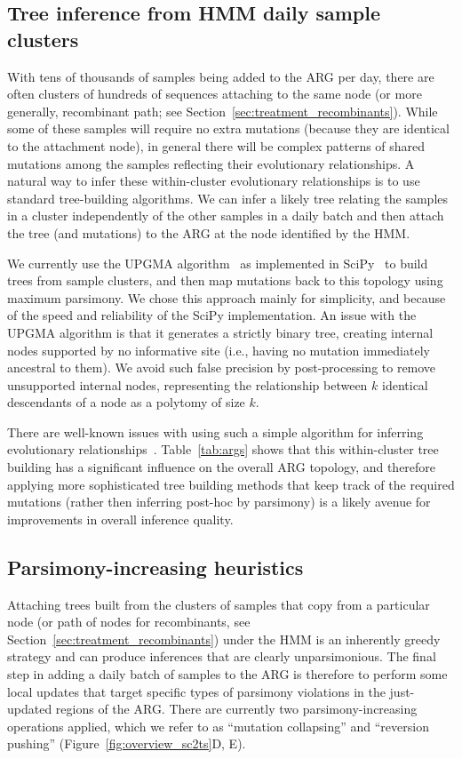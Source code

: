\documentclass{article}
\begin{document}
\subsection{Tree inference from HMM daily sample clusters}
\label{sec:sample-cluster-tree-inference}
With tens of thousands of samples being added to the ARG per day,
there are often clusters of hundreds of sequences attaching to the same node
(or more generally, recombinant path;
see Section~\ref{sec:treatment_recombinants}).
While some of these samples will require no extra mutations
(because they are identical to the attachment node), in general there
will be complex patterns of shared mutations among the samples
reflecting their evolutionary relationships. A natural way to infer
these within-cluster evolutionary relationships is to use standard
tree-building algorithms.
We can infer a likely tree relating the
samples in a cluster independently of the other samples in a
daily batch and then attach the tree (and mutations)
to the ARG at the node identified by the HMM.

We currently use the UPGMA algorithm~\citep{Michener1957-tr}
as implemented in SciPy~\citep{Pauli2020-scipy} to build trees from sample
clusters, and then map mutations back to this topology using maximum parsimony.
We chose this approach mainly for simplicity, and because of the
speed and reliability of the SciPy implementation.
An issue with the UPGMA algorithm is that it generates a strictly
binary tree, creating internal nodes
supported by no informative site (i.e., having no mutation immediately
ancestral to them). We avoid such false precision by post-processing
to remove unsupported internal nodes, representing the relationship
between $k$ identical descendants of a node as a polytomy of size $k$.

There are well-known issues with using such a simple algorithm for inferring
evolutionary relationships~\citep{Felsenstein2004-inferring}.
Table~\ref{tab:args} shows that
this within-cluster tree building has a significant influence on the
overall ARG topology,
and therefore applying more sophisticated
tree building methods that keep track of the required mutations
(rather then inferring post-hoc by parsimony) is a likely avenue
for improvements in overall inference quality.

\subsection{Parsimony-increasing heuristics}
\label{sec:parsimony-heuristics}
Attaching trees built from the clusters of samples that copy from
a particular node (or path of nodes for recombinants,
see Section~\ref{sec:treatment_recombinants}) under the
HMM is an inherently greedy strategy
and can produce inferences that are clearly unparsimonious.
The final step in adding a daily batch of samples to the ARG
is therefore to perform some local updates that target specific
types of parsimony violations in the just-updated regions of the
ARG. There are currently two parsimony-increasing operations
applied, which we refer to as ``mutation collapsing'' and ``reversion
pushing'' (Figure~\ref{fig:overview_sc2ts}D, E).
\end{document}
